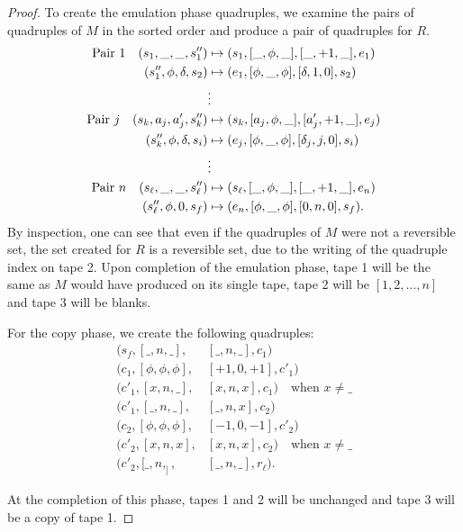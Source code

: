 \begin{proof}
  To create the emulation phase quadruples, we examine the pairs of quadruples of $M$
	in the sorted order and produce a pair of quadruples for $R$.
  \begin{align*}
    \text{Pair 1}\quad (s_1,\_,\_,s_1'') & \mapsto (s_1,[\_,\phi,\_],[\_,+1,\_],e_1)\\
    (s_1'',\phi,\delta,s_2) & \mapsto
          (e_1,[\phi,\_,\phi],[\delta,1,0],s_2)\\
					& \vdots \\
    \text{Pair \ensuremath{j}}\quad  (s_k,a_j,a'_j,s''_k) & 
					\mapsto (s_k,[a_j,\phi,\_],[a'_j,+1,\_],e_j)\\
     (s_k'',\phi,\delta,s_i) & \mapsto
          (e_j,[\phi,\_,\phi],[\delta_j,j,0],s_i)\\
					& \vdots \\
    \text{Pair }n \quad (s_\ell,\_,\_,s_\ell'') & \mapsto (s_\ell,[\_,\phi,\_],[\_,+1,\_],e_n)\\
     (s_\ell'',\phi,0,s_f) & \mapsto
          (e_n,[\phi,\_,\phi],[0,n,0],s_f).
  \end{align*}
  By inspection, one can see that even if the quadruples of $M$ were not a reversible set, the
	set created for $R$ is a reversible set, due to the writing of the quadruple index on tape 2.
	Upon completion of the emulation phase, tape 1 will be the same as $M$ would have produced on
	its single tape, tape 2 will be $[1,2,\dots,n]$ and tape 3 will be blanks.
	
	For the copy phase, we create the following quadruples:
	\begin{align*}
		(s_f,[\_,n,\_],&[\_,n,\_],c_1 )\\
		(c_1,[\phi,\phi,\phi],&[+1,0,+1],c'_1 )\\
		(c'_1,[x,n,\_],&[x,n,x],c_1 )\quad \text{when } x \ne \_\\
		(c'_1,[\_,n,\_],&[\_,n,x],c_2 )\\
		(c_2,[\phi,\phi,\phi],&[-1,0,-1],c'_2 )\\
		(c'_2,[x,n,x],&[x,n,x],c_2 )\quad \text{when }x \ne \_\\
		(c'_2,[\_,n,_],&[\_,n,\_],r_\ell).
	\end{align*}

  At the completion of this phase, tapes 1 and 2 will be unchanged and tape 3 will be a copy
	of tape 1. 
	

\end{proof}
